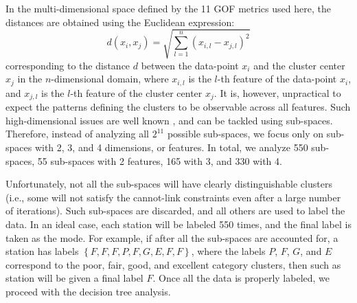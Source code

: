In the multi-dimensional space defined by the 11 GOF metrics used here, the distances are obtained using the Euclidean expression:
% 
\begin{equation}
	d(x_i, x_j) = \sqrt{ \sum_{l=1}^{n} \left( x_{i,l} - x_{j,l} \right)^2 } 
\end{equation}
% 
corresponding to the distance $d$ between the data-point $x_i$ and the cluster center $x_j$ in the $n$-dimensional domain, where $x_{i,l}$ is the $l$-th feature of the data-point $x_i$, and $x_{j,l}$ is the $l$-th feature of the cluster center $x_j$. It is, however, unpractical to expect the patterns defining the clusters to be observable across all features. Such high-dimensional issues are well known \citep[see, for instance,][]{Parsons_2004_ACM, Dy_2004_MLR}, and can be tackled using sub-spaces. Therefore, instead of analyzing all $2^{11}$ possible sub-spaces, we focus only on sub-spaces with 2, 3, and 4 dimensions, or features. In total, we analyze 550 sub-spaces, 55 sub-spaces with 2 features, 165 with 3, and 330 with 4.

Unfortunately, not all the sub-spaces will have clearly distinguishable clusters (i.e., some will not satisfy the cannot-link constraints even after a large number of iterations). Such sub-spaces are discarded, and all others are used to label the data. In an ideal case, each station will be labeled 550 times, and the final label is taken as the mode. For example, if after all the sub-spaces are accounted for, a station has labels $\left\{F, F, F, P, F, G, E, F, F\right\}$, where the labels $P$, $F$, $G$, and $E$ correspond to the poor, fair, good, and excellent category clusters, then such as station will be given a final label $F$. Once all the data is properly labeled, we proceed with the decision tree analysis.


%



